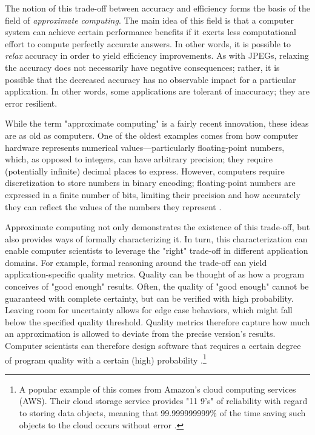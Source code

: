 \documentclass[sigplan,screen]{acmart}
\begin{document}
The notion of this trade-off between accuracy and efficiency forms the basis of the field of \emph{approximate computing}. The main idea of this field is that a computer system can achieve certain performance benefits if it exerts less computational effort to compute perfectly accurate answers. In other words, it is possible to \emph{relax} accuracy in order to yield efficiency improvements\cite{moreau2018taxonomy, mittal2016apsurvey, sampson2015thesis}. As with JPEGs, relaxing the accuracy does not necessarily have negative consequences; rather, it is possible that the decreased accuracy has no observable impact for a particular application. In other words, some applications are tolerant of inaccuracy; they are error resilient.

While the term "approximate computing" is a fairly recent innovation, these ideas are as old as computers. One of the oldest examples comes from how computer hardware represents numerical values---particularly floating-point numbers, which, as opposed to integers, can have arbitrary precision; they require (potentially infinite) decimal places to express. However, computers require discretization to store numbers in binary encoding; floating-point numbers are expressed in a finite number of bits, limiting their precision and how accurately they can reflect the values of the numbers they represent \cite{moreau2018taxonomy, friedman1996bias}.

Approximate computing not only demonstrates the existence of this trade-off, but also provides ways of formally characterizing it. In turn, this characterization can enable computer scientists to leverage the "right" trade-off in different application domains. For example, formal reasoning around the trade-off can yield application-specific quality metrics. Quality can be thought of as how a program conceives of "good enough" results. Often, the quality of "good enough" cannot be guaranteed with complete certainty, but can be verified with high probability. Leaving room for uncertainty  allows for edge case behaviors, which might fall below the specified quality threshold. Quality metrics therefore capture how much an approximation is allowed to deviate from the precise version's results. Computer scientists can therefore design software that requires a certain degree of program quality with a certain (high) probability \cite{sampson2015thesis}.\footnote{A popular example of this comes from Amazon's cloud computing services (AWS). Their cloud storage service provides "11 9's" of reliability with regard to storing data objects, meaning that 99.999999999\% of the time saving such objects to the cloud occurs without error \cite{amazon2020s3}.}
\end{document}
